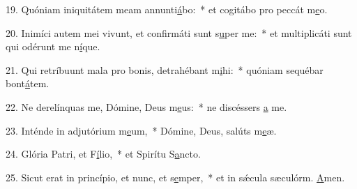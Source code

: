 19. Quóniam iniquitátem meam annunti\uline{á}bo:~* et cogitábo pro peccát m\uline{e}o.\par 
20. Inimíci autem mei vivunt, et confirmáti sunt s\uline{u}per me:~* et multiplicáti sunt qui odérunt me n\uline{í}que.\par 
21. Qui retríbuunt mala pro bonis, detrahébant m\uline{i}hi:~* quóniam sequébar bont\uline{á}tem.\par 
22. Ne derelínquas me, Dómine, Deus m\uline{e}us:~* ne discéssers \uline{a} me.\par 
23. Inténde in adjutórium m\uline{e}um,~* Dómine, Deus, salúts m\uline{e}æ.\par 
24. Glória Patri, et F\uline{í}lio,~* et Spirítu S\uline{a}ncto.\par 
25. Sicut erat in princípio, et nunc, et s\uline{e}mper,~* et in sǽcula sæculórm. \uline{A}men.\par 
